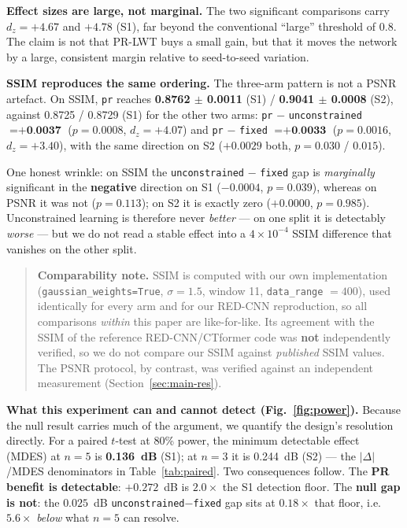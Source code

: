 \documentclass[conference]{IEEEtran}
\begin{document}
\textbf{Effect sizes are large, not marginal.} The two significant comparisons
carry $d_z = +4.67$ and $+4.78$ (S1), far beyond the conventional ``large''
threshold of $0.8$. The claim is not that PR-LWT buys a small gain, but that it
moves the network by a large, consistent margin relative to seed-to-seed
variation.

\textbf{SSIM reproduces the same ordering.} The three-arm pattern is not a PSNR
artefact. On SSIM, \texttt{pr} reaches \textbf{0.8762 $\pm$ 0.0011} (S1) /
\textbf{0.9041 $\pm$ 0.0008} (S2), against 0.8725 / 0.8729 (S1) for the other two
arms: \texttt{pr} $-$ \texttt{unconstrained} $= \textbf{+0.0037}$
($p = 0.0008$, $d_z = +4.07$) and \texttt{pr} $-$ \texttt{fixed} $= \textbf{+0.0033}$
($p = 0.0016$, $d_z = +3.40$), with the same direction on S2 ($+0.0029$ both,
$p = 0.030$ / $0.015$).

One honest wrinkle: on SSIM the \texttt{unconstrained} $-$ \texttt{fixed} gap is
\emph{marginally} significant in the \textbf{negative} direction on S1
($-0.0004$, $p = 0.039$), whereas on PSNR it was not ($p = 0.113$); on S2 it is
exactly zero ($+0.0000$, $p = 0.985$). Unconstrained learning is therefore never
\emph{better} --- on one split it is detectably \emph{worse} --- but we do not
read a stable effect into a $4\times10^{-4}$ SSIM difference that vanishes on the
other split.

\begin{quote}
\small\textbf{Comparability note.} SSIM is computed with our own implementation
(\texttt{gaussian\_weights=True}, $\sigma = 1.5$, window 11,
\texttt{data\_range} $= 400$), used identically for every arm and for our RED-CNN
reproduction, so all comparisons \emph{within} this paper are like-for-like. Its
agreement with the SSIM of the reference RED-CNN/CTformer code was \textbf{not}
independently verified, so we do not compare our SSIM against \emph{published}
SSIM values. The PSNR protocol, by contrast, was verified against an independent
measurement (Section~\ref{sec:main-res}).
\end{quote}

\textbf{What this experiment can and cannot detect (Fig.~\ref{fig:power}).}
Because the null result carries much of the argument, we quantify the design's
resolution directly. For a paired $t$-test at 80\% power, the minimum detectable
effect (MDES) at $n=5$ is \textbf{0.136~dB} (S1); at $n=3$ it is 0.244~dB (S2)
--- the $|\Delta|$/MDES denominators in Table~\ref{tab:paired}. Two consequences
follow. The \textbf{PR benefit is detectable}: $+0.272$~dB is $2.0\times$ the S1
detection floor. The \textbf{null gap is not}: the $0.025$~dB
\texttt{unconstrained}$-$\texttt{fixed} gap sits at $0.18\times$ that floor,
i.e.\ $5.6\times$ \emph{below} what $n=5$ can resolve.
\end{document}
